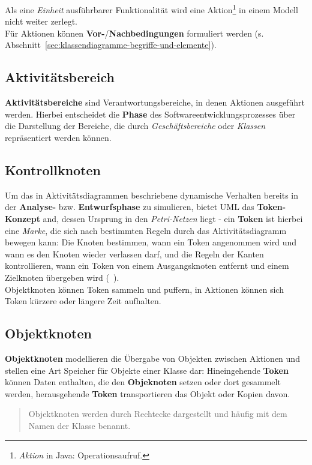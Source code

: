 \noindent
Als eine \textit{Einheit} ausführbarer Funktionalität wird eine Aktion\footnote{
\textit{Aktion} in Java: Operationsaufruf.
} in einem Modell nicht weiter zerlegt.\\
Für Aktionen können \textbf{Vor-}/\textbf{Nachbedingungen} formuliert werden (s. Abschnitt~\ref{sec:klassendiagramme-begriffe-und-elemente}).

\subsection{Aktivitätsbereich}
\textbf{Aktivitätsbereiche} sind Verantwortungsbereiche, in denen Aktionen ausgeführt werden.
Hierbei entscheidet die \textbf{Phase} des Softwareentwicklungsprozesses über die Darstellung der Bereiche, die durch \textit{Geschäftsbereiche} oder \textit{Klassen} repräsentiert werden können.

\subsection{Kontrollknoten}
Um das in Aktivitätsdiagrammen beschriebene dynamische Verhalten bereits in der \textbf{Analyse-} bzw. \textbf{Entwurfsphase} zu simulieren, bietet UML das \textbf{Token-Konzept} and, dessen Ursprung in den \textit{Petri-Netzen} liegt - ein \textbf{Token} ist hierbei eine \textit{Marke}, die sich nach bestimmten Regeln durch das Aktivitätsdiagramm bewegen kann: Die Knoten bestimmen, wann ein Token angenommen wird und wann es den Knoten wieder verlassen darf, und die Regeln der Kanten kontrollieren, wann ein Token von einem Ausgangsknoten entfernt und einem Zielknoten übergeben wird (~\cite[323]{Bal05}).\\
Objektknoten können Token sammeln und puffern, in Aktionen können sich Token kürzere oder längere Zeit aufhalten.\\

\subsection{Objektknoten}


\textbf{Objektknoten} modellieren die Übergabe von Objekten zwischen Aktionen und stellen eine Art Speicher für Objekte einer Klasse dar: Hineingehende \textbf{Token} können Daten enthalten, die den \textbf{Objeknoten} setzen oder dort gesammelt werden, herausgehende \textbf{Token} transportieren das Objekt oder Kopien davon.\\

\blockquote[{\cite[73]{Bal05}}]{
    Objektknoten werden durch Rechtecke dargestellt und häufig mit dem Namen der Klasse benannt.
}

